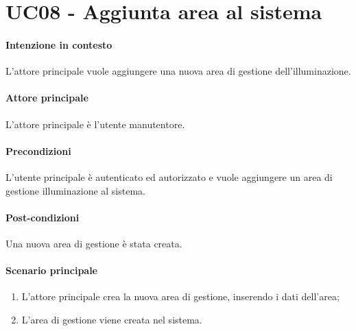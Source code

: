 \section{UC08 - Aggiunta area al sistema}\label{uc:08}
\paragraph{Intenzione in contesto} L'attore principale vuole aggiungere una nuova area di gestione dell'illuminazione.


\paragraph{Attore principale} L'attore principale è l'utente manutentore.



\paragraph{Precondizioni}
L'utente principale è autenticato ed autorizzato e vuole aggiungere un area di gestione illuminazione al sistema.

\paragraph{Post-condizioni}
Una nuova area di gestione è stata creata.

\paragraph{Scenario principale}
\begin{enumerate}
    \item L'attore principale crea la nuova area di gestione, inserendo i dati dell'area;
    \item L'area di gestione viene creata nel sistema.
\end{enumerate}
